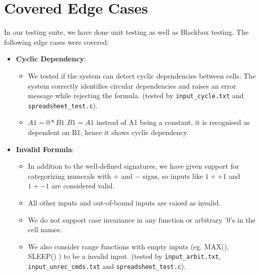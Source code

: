 \documentclass[10pt,a4paper]{article}  %
\begin{document}
\section{Covered Edge Cases}

In our testing suite, we have done unit testing as well as Blackbox testing.
The following edge cases were covered:

\begin{itemize}
    \item \textbf{Cyclic Dependency}: 
    \begin{itemize}
        \item We tested if the system can detect cyclic dependencies between cells. The system correctly identifies circular dependencies and raises an error message while rejecting the formula. (tested by \texttt{input\_cycle.txt} and \texttt{spreadsheet\_test.c}).
         \item $A1=0*B1$ $B1=A1$ instead of A1 being a constant, it is recognised as dependent on B1, hence it shows cyclic dependency.
    \end{itemize}
    
    \item \textbf{Invalid Formula}: 
    \begin{itemize}
        \item In addition to the well-defined signatures, we have given support for categorizing numerals with \(+\) and \(-\) signs, so inputs like \(1++1\) and \(1+-1\) are considered valid. 
        \item All other inputs and out-of-bound inputs are raised as invalid. 
        \item We do not support case invariance in any function or arbitrary '0's in the cell names. 
        \item We also consider range functions with empty inputs (eg. MAX(), SLEEP() ) to be a invalid input. (tested by \texttt{input\_arbit.txt}, \texttt{input\_unrec\_cmds.txt} and \texttt{spreadsheet\_test.c}).
        

\end{itemize}
\end{itemize}
\end{document}
